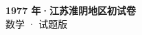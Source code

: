 \documentclass[zihao=-4, a4paper]{ctexart}
\begin{document}
\begin{center}
  {\Large\bfseries 1977 年·江苏淮阴地区初试卷}\\[4pt]
  {\large 数学 · 试题版}
\end{center}
\medskip
{}

\end{document}
